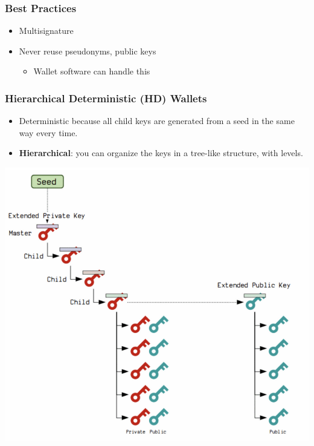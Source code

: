 \documentclass{beamer}
\begin{document}
\begin{frame}
  \frametitle{Best Practices}
  
\begin{itemize}
	\item Multisignature
	\item Never reuse pseudonyms, public keys
	\begin{itemize}
		\item Wallet software can handle this
	\end{itemize}
\end{itemize}
\end{frame}
\begin{frame}
  \frametitle{Hierarchical Deterministic (HD) Wallets}
	\begin{itemize}
		\item Deterministic because all child keys are generated from a seed in the same way every time.
		\item \textbf{Hierarchical}: you can organize the keys in a tree-like structure, with levels.
	\end{itemize}
	\centering
	\includegraphics[scale=0.42]{hd}
\end{frame}

\end{document}
